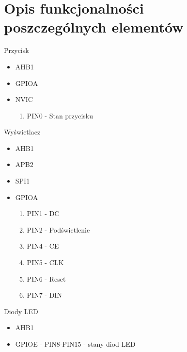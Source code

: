 \documentclass{article}
\begin{document}

\section{Opis funkcjonalności poszczególnych elementów}

Przycisk
\begin{itemize}
    \item AHB1
    \item GPIOA
    \item NVIC
    \begin{enumerate}
        \item PIN0 - Stan przycisku
    \end{enumerate}
\end{itemize}

Wyświetlacz
\begin{itemize}
    \item AHB1
    \item APB2
    \item SPI1
    \item GPIOA
        \begin{enumerate}
            \item PIN1 - DC
            \item PIN2 - Podświetlenie
            \item PIN4 - CE
            \item PIN5 - CLK
            \item PIN6 - Reset
            \item PIN7 - DIN
        \end{enumerate}
\end{itemize}

Diody LED
\begin{itemize}
    \item AHB1
    \item GPIOE - PIN8-PIN15 - stany diod LED
\end{itemize}
\end{document}
